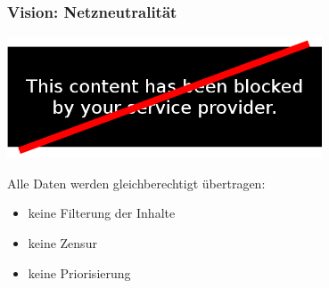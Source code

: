 \documentclass[10pt]{beamer}
\begin{document}
\begin{frame}
	\frametitle{Vision: Netzneutralität}
	\begin{center}
		\includegraphics[width=0.7\textwidth]{images/netneutrality}
	\end{center}
	Alle Daten werden gleichberechtigt übertragen:
	\begin{itemize}[<+->]
		\item keine Filterung der Inhalte
		\item keine Zensur
		\item keine Priorisierung
	\end{itemize}

\end{frame}
\end{document}
